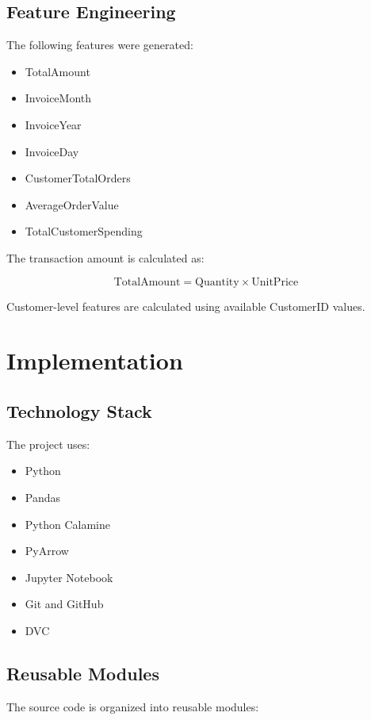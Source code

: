 \documentclass[12pt,a4paper]{report}
\begin{document}
\section{Feature Engineering}

The following features were generated:

\begin{itemize}
    \item TotalAmount
    \item InvoiceMonth
    \item InvoiceYear
    \item InvoiceDay
    \item CustomerTotalOrders
    \item AverageOrderValue
    \item TotalCustomerSpending
\end{itemize}

The transaction amount is calculated as:

\[
\text{TotalAmount} =
\text{Quantity} \times \text{UnitPrice}
\]

Customer-level features are calculated using
available CustomerID values.

\chapter{Implementation}

\section{Technology Stack}

The project uses:

\begin{itemize}
    \item Python
    \item Pandas
    \item Python Calamine
    \item PyArrow
    \item Jupyter Notebook
    \item Git and GitHub
    \item DVC
\end{itemize}

\section{Reusable Modules}

The source code is organized into reusable modules:
\end{document}
